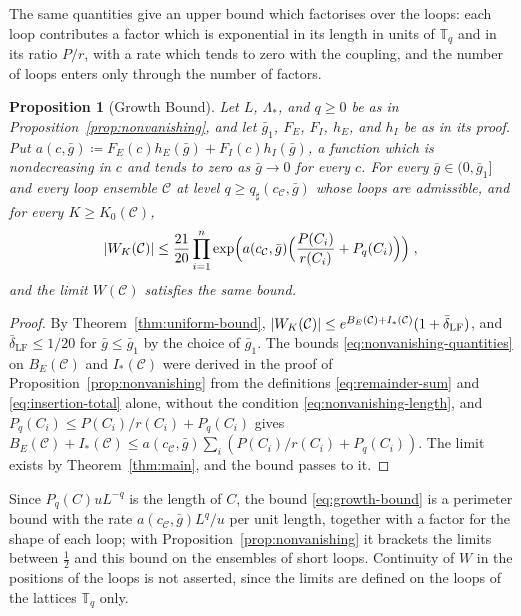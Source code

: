 \documentclass[11pt]{preprint}
\DeclarePairedDelimiter{\abs}{\lvert}{\rvert}
\numberwithin{equation}{section}
\newtheorem{proposition}[theorem]{Proposition}
\theoremstyle{definition}
\theoremstyle{remark}
\theoremstyle{plain}
\begin{document}
The same quantities give an upper bound which factorises over the loops: each loop contributes a factor which is exponential in its length in units of $\mathbb T_q$ and in its ratio $P/r$, with a rate which tends to zero with the coupling, and the number of loops enters only through the number of factors.

\begin{proposition}[Growth Bound]\label{prop:growth-bound}
Let $L$, $\Lambda_*$, and $q \geq 0$ be as in Proposition~\ref{prop:nonvanishing}, and let $\bar g_1$, $F_E$, $F_I$, $h_E$, and $h_I$ be as in its proof. Put $a(c, \bar g) \coloneqq F_E(c)h_E(\bar g) + F_I(c)h_I(\bar g)$, a function which is nondecreasing in $c$ and tends to zero as $\bar g \to 0$ for every $c$. For every $\bar g \in (0, \bar g_1]$ and every loop ensemble $\mathcal C$ at level $q \geq q_\sharp(c_{\mathcal C}, \bar g)$ whose loops are admissible, and for every $K \geq K_0(\mathcal C)$,
\begin{equation}\label{eq:growth-bound}
    \abs{W_K(\mathcal C)} \leq \frac{21}{20}\prod_{i=1}^{n}\exp\Bigl(a(c_{\mathcal C}, \bar g)\Bigl(\frac{P(C_i)}{r(C_i)} + P_q(C_i)\Bigr)\Bigr)\;,
\end{equation}
and the limit $W(\mathcal C)$ satisfies the same bound.
\end{proposition}

\begin{proof}
By Theorem~\ref{thm:uniform-bound}, $\abs{W_K(\mathcal C)} \leq e^{B_E(\mathcal C) + I_*(\mathcal C)}(1 + \bar\delta_{\mathrm{LF}})$, and $\bar\delta_{\mathrm{LF}} \leq 1/20$ for $\bar g \leq \bar g_1$ by the choice of $\bar g_1$. The bounds \eqref{eq:nonvanishing-quantities} on $B_E(\mathcal C)$ and $I_*(\mathcal C)$ were derived in the proof of Proposition~\ref{prop:nonvanishing} from the definitions \eqref{eq:remainder-sum} and \eqref{eq:insertion-total} alone, without the condition \eqref{eq:nonvanishing-length}, and $P_q(C_i) \leq P(C_i)/r(C_i) + P_q(C_i)$ gives $B_E(\mathcal C) + I_*(\mathcal C) \leq a(c_{\mathcal C}, \bar g)\sum_i(P(C_i)/r(C_i) + P_q(C_i))$. The limit exists by Theorem~\ref{thm:main}, and the bound passes to it.
\end{proof}

Since $P_q(C)uL^{-q}$ is the length of $C$, the bound \eqref{eq:growth-bound} is a perimeter bound with the rate $a(c_{\mathcal C}, \bar g)L^q/u$ per unit length, together with a factor for the shape of each loop; with Proposition~\ref{prop:nonvanishing} it brackets the limits between $\frac12$ and this bound on the ensembles of short loops. Continuity of $W$ in the positions of the loops is not asserted, since the limits are defined on the loops of the lattices $\mathbb T_q$ only.
\end{document}
